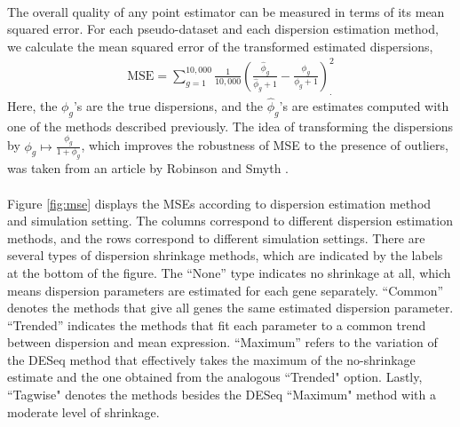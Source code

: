 \documentclass[10pt]{article}
\providecommand{\wh}[1]{\widehat{#1}}
\begin{document}
\paragraph{} \indent The overall quality of any point estimator can be measured in terms of its mean squared error. For each pseudo-dataset and each dispersion estimation method, we calculate the mean squared error of the transformed estimated dispersions,
\begin{align*}
\text{MSE} = \sum_{g = 1}^{10,000} \frac{1}{10,000} \left ( \frac{\wh{\phi}_g}{\wh{\phi}_g + 1} - \frac{\phi_g}{\phi_g + 1} \right )^2_. %
\end{align*} Here, the $\phi_g$'s are the true dispersions, and the $\wh{\phi}_g$'s are estimates computed with one of the methods described previously. The idea of transforming the dispersions by $\phi_g \mapsto\frac{\phi_g}{1+\phi_g}$, which improves the robustness of MSE to the presence of outliers, was taken from an article by Robinson and Smyth \cite{rs07}.

\paragraph{} \indent Figure \ref{fig:mse} displays the MSEs according to dispersion estimation method and simulation setting. The columns correspond to different dispersion estimation methods, and the rows correspond to different simulation settings. There are several types of dispersion shrinkage methods, { which are indicated by the labels at the bottom of the figure.} %
 The ``None'' type indicates no shrinkage at all, which means dispersion parameters are estimated for each gene separately. ``Common'' denotes the methods that give all genes the same estimated dispersion parameter. ``Trended'' indicates the methods that fit each parameter to a common trend between dispersion and mean expression. ``Maximum'' refers to the variation of the DESeq method that effectively takes the maximum of the no-shrinkage estimate and the one obtained from the analogous ``Trended" option. Lastly, ``Tagwise" denotes the methods besides the DESeq ``Maximum" method with a moderate level of shrinkage.
 
\end{document}
